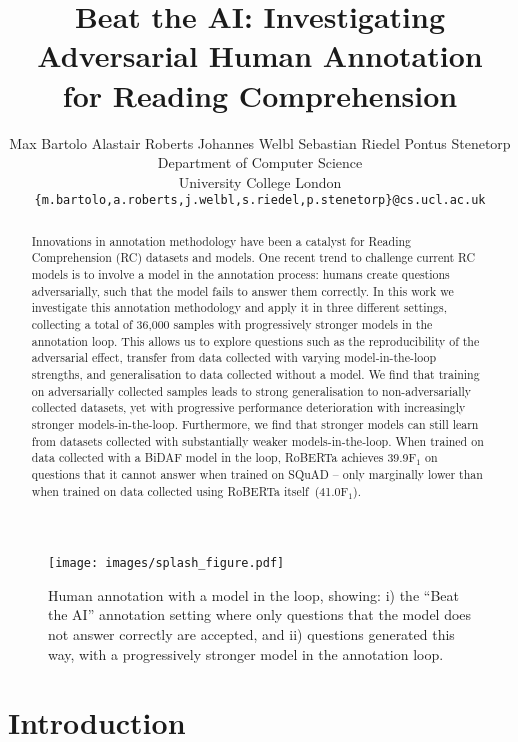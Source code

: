 \documentclass[11pt,a4paper]{article}
\title{Beat the AI: Investigating Adversarial Human Annotation\\for Reading Comprehension}
\author{
  Max Bartolo \quad Alastair Roberts \quad Johannes Welbl \quad Sebastian Riedel \quad Pontus Stenetorp \\
  Department of Computer Science \\
  University College London \\
  {\tt \{m.bartolo,a.roberts,j.welbl,s.riedel,p.stenetorp\}@cs.ucl.ac.uk}
}
\date{}
\newcommand{\squad}{SQuAD}
\begin{document}
\maketitle

\begin{abstract}
Innovations in annotation methodology have been a catalyst for Reading Comprehension (RC) datasets and models.
One recent trend to challenge current RC models is to involve a model in the annotation process: humans create questions adversarially, such that the model fails to answer them correctly.
In this work we investigate this annotation methodology and apply it in three different settings, collecting a total of 36,000 samples with progressively stronger models in the annotation loop.
This allows us to explore questions such as the reproducibility of the adversarial effect, transfer from data collected with varying model-in-the-loop strengths, and generalisation to data collected without a model.
We find that training on adversarially collected samples leads to strong generalisation to non-adversarially collected datasets, yet with progressive performance deterioration with increasingly stronger models-in-the-loop.
Furthermore, we find that stronger models can still learn from datasets collected with substantially weaker models-in-the-loop.
When trained on data collected with a BiDAF model in the loop, RoBERTa achieves 39.9F$_\text{1}$ on questions that it cannot answer when trained on \squad{} -- only marginally lower than when trained on data collected using RoBERTa itself~(41.0F$_\text{1}$).
\end{abstract}


\begin{figure}[t]
    \centering
    \texttt{[image: images/splash\_figure.pdf]}
    \caption{Human annotation with a model in the loop, showing: i) the ``Beat the AI'' annotation setting where only questions that the model does not answer correctly are accepted, and ii) questions generated this way, with a progressively stronger model in the annotation loop.
    } 
    \label{fig:progression}
\end{figure}


\section{Introduction}
\end{document}

